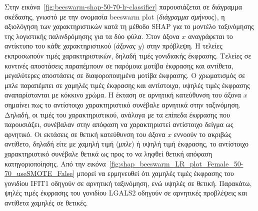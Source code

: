 \documentclass[12pt]{report}
\begin{document}
        \par
            Στην εικόνα~\ref{fig:beeswarm-shap-50-70-lr-classifier} παρουσιάζεται σε διάγραμμα σκέδασης, γνωστό με την ονομασία beeswarm plot (\emph{διάγραμμα σμήνους}), η αξιολόγηση των χαρακτηριστικών κατά τη μέθοδο SHAP για το μοντέλο ταξινόμησης της λογιστικής παλινδρόμησης για τα δύο φύλα. Στον άξονα $x$ αναγράφεται το αντίκτυπο του κάθε χαρακτηριστικού (\emph{άξονας $y$}) στην πρόβλεψη. Η τελείες εκπροσωπούν τιμές χαρακτηριστικών, δηλαδή τιμές γονιδιακής έκφρασης. Τελείες σε κοντινές αποστάσεις παραπέμπουν σε παρόμοια μοτίβα έκφρασης και αντίθετα, μεγαλύτερες αποστάσεις σε διαφοροποιημένα μοτίβα έκφρασης. Ο χρωματισμός σε μπλε παραπέμπει σε χαμηλές τιμές έκφρασης και αντίστοιχα, υψηλές τιμές έκφρασης αναπαρίστανται με κόκκινο χρώμα. Η έκταση σε αρνητική κατεύθυνση του άξονα $x$ σημαίνει πως το αντίστοιχο χαρακτηριστικό συνέβαλε αρνητικά στην ταξινόμηση. Δηλαδή, οι τιμές του χαρακτηριστικού, ανάλογα με τα επίπεδα έκφρασης που παρουσιάζει, συνέβαλαν στην απόφαση να χαρακτηριστεί αντίστοιχο δείγμα ως αρνητικό. Οι εκτάσεις σε θετική κατεύθυνση του άξονα $x$ εννοούν το ακριβώς αντίθετο, δηλαδή είτε με χαμηλή τιμή (\emph{μπλε}) ή υψηλή τιμή έκφρασης, το αντίστοιχο χαρακτηριστικό συνέβαλε θετικά ως προς το να ληφθεί θετική απόφαση κατηγοριοποίησης. Από την εικόνα~\ref{fig:shap_beeswarm_LR_plot_Female_50-70_useSMOTE_False} μπορεί να ερμηνευθεί ότι χαμηλές τιμές έκφρασης του γονιδίου IFIT1 οδηγούν σε αρνητική ταξινόμηση, ενώ υψηλές σε θετική. Παρακάτω, ψηλές τιμές έκφρασης του γονιδίου LGALS2 οδηγούν σε αρνητικές προβλέψεις και αντίθετα χαμηλές σε θετικές.
\end{document}
